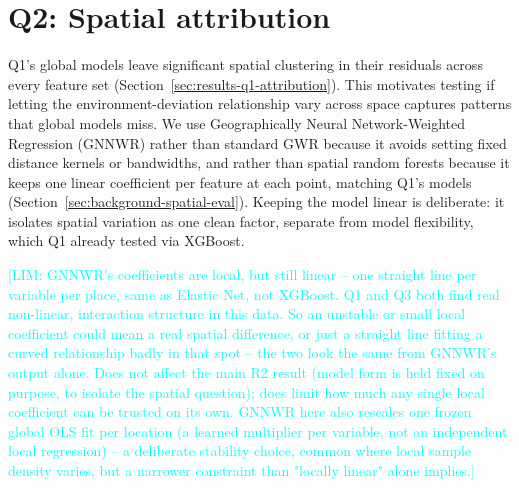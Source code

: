 \documentclass[logo,msc,ai]{infthesis}           %
\newcommand{\limit}[1]{\textcolor{cyan}{[LIM: #1]}}
\begin{document}
\section{Q2: Spatial attribution}

Q1's global models leave significant spatial clustering in their residuals across every feature set (Section~\ref{sec:results-q1-attribution}). This motivates testing if letting the environment-deviation relationship vary across space captures patterns that global models miss. We use Geographically Neural Network-Weighted Regression (GNNWR) \cite{du2020Geographically_C6_GWR} rather than standard GWR because it avoids setting fixed distance kernels or bandwidths, and rather than spatial random forests because it keeps one linear coefficient per feature at each point, matching Q1's models (Section~\ref{sec:background-spatial-eval}). Keeping the model linear is deliberate: it isolates spatial variation as one clean factor, separate from model flexibility, which Q1 already tested via XGBoost.

\limit{GNNWR's coefficients are local, but still linear -- one straight line per variable per place, same as Elastic Net, not XGBoost. Q1 and Q3 both find real non-linear, interaction structure in this data. So an unstable or small local coefficient could mean a real spatial difference, or just a straight line fitting a curved relationship badly in that spot -- the two look the same from GNNWR's output alone. Does not affect the main R2 result (model form is held fixed on purpose, to isolate the spatial question); does limit how much any single local coefficient can be trusted on its own. GNNWR here also rescales one frozen global OLS fit per location (a learned multiplier per variable, not an independent local regression) -- a deliberate stability choice, common where local sample density varies, but a narrower constraint than "locally linear" alone implies.}
\end{document}
